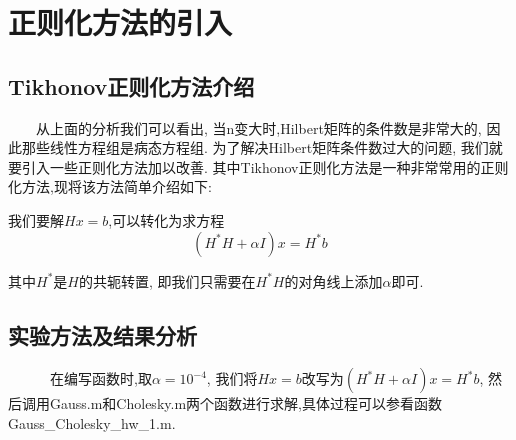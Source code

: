\documentclass[a4paper]{article}
\begin{document}
\begin{CJK*}{GBK}{song}
\begin{center}
\begin{table*}[!htpb]
{\begin{threeparttable}[!htpb]
\begin{tabular}{ccccc ccccc ccccc}
 \bottomrule
\end{tabular}
\end{threeparttable}}%
\end{table*}
\end{center}


\section{正则化方法的引入}
\subsection{Tikhonov正则化方法介绍}
~~~~从上面的分析我们可以看出, 当n变大时,Hilbert矩阵的条件数是非常大的, 因此那些线性方程组是病态方程组. 为了解决Hilbert矩阵条件数过大的问题, 我们就要引入一些正则化方法加以改善. 其中Tikhonov正则化方法是一种非常常用的正则化方法,现将该方法简单介绍如下:\par
我们要解$Hx=b$,可以转化为求方程
\begin{equation}\label{TikhonovEqu}
(H^*H+\alpha I)x=H^*b
\end{equation}

其中$H^*$是$H$的共轭转置, 即我们只需要在$H^*H$的对角线上添加$\alpha$即可.

\subsection{实验方法及结果分析}
~~~~~~在编写函数时,取$\alpha=10^{-4}$, 我们将$Hx=b$改写为$(H^*H+\alpha I)x=H^*b$, 然后调用Gauss.m和Cholesky.m两个函数进行求解,具体过程可以参看函数Gauss\_Cholesky\_hw\_1.m.\par


\end{CJK*}
\end{document}
